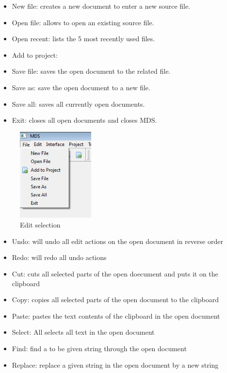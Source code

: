                         \begin{itemize}
                            \item New file: creates a new document to enter a new source file.
                            \item Open file: allows to open an existing source file.
                            \item Open recent: lists the 5 most recently used files.
                            \item Add to project:
                            \item Save file: saves the open document to the related file.
                            \item Save as: save the open document to a new file.
                            \item Save all: saves all currently open documents.
                            \item Exit: closes all open documents and closes MDS.
                        \end{itemize}

                        \begin{figure}
                                \centering
                                \includegraphics[width=110pt]{img/menu_file.png}
                                \caption{Edit selection}
                        \end{figure}

                        \begin{itemize}
                            \item Undo: will undo all edit actions on the open document in reverse order
                            \item Redo: will redo all undo actions
                            \item Cut: cuts all selected parts of the open doecument and puts it on the clipboard
                            \item Copy: copies all selected parts of the open document to the clipboard
                            \item Paste: pastes the text contents of the clipboard in the open document
                            \item Select: All selects all text in the open document
                            \item Find: find a to be given string through the open document
                            \item Replace: replace a given string in the open document by a new string
                        \end{itemize}

